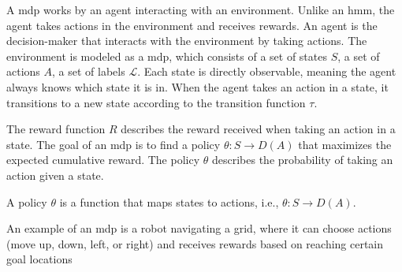 A \gls{mdp} works by an agent interacting with an environment.
Unlike an \gls{hmm}, the agent  takes actions in the environment and receives rewards.
An agent is the decision-maker that interacts with the environment by taking actions.
The environment is modeled as a \gls{mdp}, which consists of a set of states $S$, a set of actions $A$, a set of labels $\mathcal{L}$.
Each state is directly observable, meaning the agent always knows which state it is in.
When the agent takes an action in a state, it transitions to a new state according to the transition function $\tau$.

The reward function $R$ describes the reward received when taking an action in a state.
The goal of an \gls{mdp} is to find a policy $\theta: S \rightarrow D(A)$ that maximizes the expected cumulative reward.
The policy $\theta$ describes the probability of taking an action given a state.

\begin{definition}[Policy]
    A policy $\theta$ is a function that maps states to actions, i.e., $\theta: S \rightarrow D(A)$.
\end{definition}

An example of an \gls{mdp} is a robot navigating a grid, where it can choose actions (move up, down, left, or right) and receives rewards based on reaching certain goal locations
